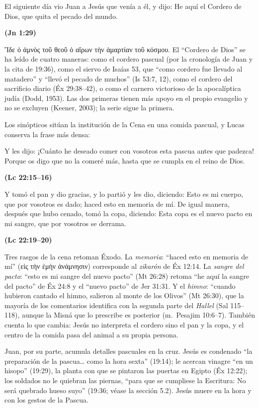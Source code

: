 \documentclass[11pt,letterpaper]{article}
\newcommand{\grc}[1]{\foreignlanguage{ancientgreek}{#1}}
\newcommand{\fuente}[1]{\par\hfill{\upshape\bfseries\small\textcolor{tierraroja}{#1}}}
\begin{document}
\begin{cita}El siguiente día vio Juan a Jesús que venía a él, y dijo: He aquí el Cordero de Dios, que quita el pecado del mundo.\fuente{(Jn 1:29)}\end{cita}

\grc{Ἴδε ὁ ἀμνὸς τοῦ θεοῦ ὁ αἴρων τὴν ἁμαρτίαν τοῦ κόσμου}. El ``Cordero de Dios'' se ha leído de cuatro maneras: como el cordero pascual (por la cronología de Juan y la cita de 19:36), como el siervo de Isaías 53, que ``como cordero fue llevado al matadero'' y ``llevó el pecado de muchos'' (Is 53:7, 12), como el cordero del sacrificio diario (Éx 29:38--42), o como el carnero victorioso de la apocalíptica judía (Dodd, 1953). Las dos primeras tienen más apoyo en el propio evangelio y no se excluyen (Keener, 2003); la serie sigue la primera.

Los sinópticos sitúan la institución de la Cena en una comida pascual, y Lucas conserva la frase más densa:

\begin{cita}Y les dijo: ¡Cuánto he deseado comer con vosotros esta pascua antes que padezca! Porque os digo que no la comeré más, hasta que se cumpla en el reino de Dios.\fuente{(Lc 22:15--16)}\end{cita}

\begin{cita}Y tomó el pan y dio gracias, y lo partió y les dio, diciendo: Esto es mi cuerpo, que por vosotros es dado; haced esto en memoria de mí. De igual manera, después que hubo cenado, tomó la copa, diciendo: Esta copa es el nuevo pacto en mi sangre, que por vosotros se derrama.\fuente{(Lc 22:19--20)}\end{cita}

Tres rasgos de la cena retoman Éxodo. La \emph{memoria}: ``haced esto en memoria de mí'' (\grc{εἰς τὴν ἐμὴν ἀνάμνησιν}) corresponde al \emph{zikarón} de Éx 12:14. La \emph{sangre del pacto}: ``esto es mi sangre del nuevo pacto'' (Mt 26:28) retoma ``he aquí la sangre del pacto'' de Éx 24:8 y el ``nuevo pacto'' de Jer 31:31. Y el \emph{himno}: ``cuando hubieron cantado el himno, salieron al monte de los Olivos'' (Mt 26:30), que la mayoría de los comentarios identifica con la segunda parte del \emph{Hallel} (Sal 115--118), aunque la Misná que lo prescribe es posterior (m.~Pesajim 10:6--7). También cuenta lo que cambia: Jesús no interpreta el cordero sino el pan y la copa, y el centro de la comida pasa del animal a su propia persona.

Juan, por su parte, acumula detalles pascuales en la cruz. Jesús es condenado ``la preparación de la pascua\ldots{} como la hora sexta'' (19:14); le acercan vinagre ``en un hisopo'' (19:29), la planta con que se pintaron las puertas en Egipto (Éx 12:22); los soldados no le quiebran las piernas, ``para que se cumpliese la Escritura: No será quebrado hueso suyo'' (19:36; véase la sección 5.2). Jesús muere en la hora y con los gestos de la Pascua.
\end{document}

